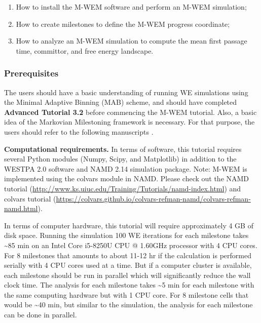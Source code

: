 \begin{enumerate}
  \item How to install the M-WEM software and perform an M-WEM simulation;
  \item How to create milestones to define the M-WEM progress coordinate;
  \item How to analyze an M-WEM simulation to compute the mean first passage time, committor, and free energy landscape. 
\end{enumerate}

\subsubsection{Prerequisites}

The users should have a basic understanding of running WE simulations using the Minimal Adaptive Binning (MAB) scheme, and should have completed \textbf{Advanced Tutorial 3.2} before commencing the M-WEM tutorial. 
Also, a basic idea of the Markovian Milestoning framework is necessary. 
For that purpose, the users should refer to the following manuscripts \cite{Vanden-Eijnden2009Markovian, Maragliano2009Free, Ray2022Markovian}.

\textbf{Computational requirements.} In terms of software, this tutorial requires several Python modules (Numpy, Scipy, and Matplotlib) in addition to the WESTPA 2.0 software and NAMD 2.14 simulation package. 
Note: M-WEM is implemented using the colvars module in NAMD. 
Please check out the NAMD tutorial ({\url{http://www.ks.uiuc.edu/Training/Tutorials/namd-index.html}}) and colvars tutorial ({\url{https://colvars.github.io/colvars-refman-namd/colvars-refman-namd.html}}).
 
In terms of computer hardware, this tutorial will require approximately 4 GB of disk space. 
Running the simulation 100 WE iterations for each milestone takes \textasciitilde85 min on an Intel Core i5-8250U CPU @ 1.60GHz processor with 4 CPU cores. 
For 8 milestones that amounts to about 11-12 hr if the calculation is performed serially with 4 CPU cores used at a time. 
But if a computer cluster is available, each milestone should be run in parallel which will significantly reduce the wall clock time. 
The analysis for each milestone takes \textasciitilde5 min for each milestone with the same computing hardware but with 1 CPU core. 
For 8 milestone cells that would be \textasciitilde40 min, but similar to the simulation, the analysis for each milestone can be done in parallel.  

